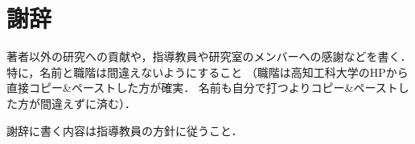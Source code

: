 \chapter*{謝辞}

著者以外の研究への貢献や，指導教員や研究室のメンバーへの感謝などを書く．
特に，名前と職階は間違えないようにすること
（職階は高知工科大学のHPから直接コピー{\&}ペーストした方が確実．
名前も自分で打つよりコピー{\&}ペーストした方が間違えずに済む）．

謝辞に書く内容は指導教員の方針に従うこと．
